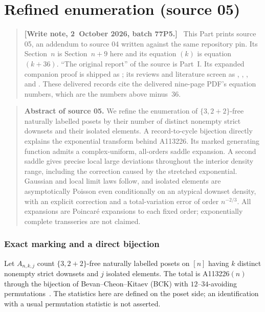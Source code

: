 \documentclass[11pt]{article}
\theoremstyle{remark}\newtheorem{remark}[theorem]{Remark}
\newenvironment{writenote}{\begin{quote}\small\raggedright\textbf{[Write note, 2~October 2026, batch 77P5.]}\ }{\end{quote}}
\begin{document}
\part{Refined enumeration (source 05)}
\label{vav:part:two}
\begin{writenote}
This Part prints source 05, an addendum to source 04 written against the
same repository pin. Its Section~$n$ is Section~$n+9$ here and its
equation $(k)$ is equation $(k+36)$. ``The original report'' of the source
is Part~I. Its expanded companion proof is shipped as
; its reviews and literature screen as
,
,
,
 and
. These delivered records cite the
delivered nine-page PDF's equation numbers, which are the numbers above
minus~36.
\end{writenote}
\begin{quote}\small
\textbf{Abstract of source 05.}
We refine the enumeration of $\{3,2+2\}$-free naturally labelled posets by their number of distinct nonempty strict downsets and their isolated elements. A record-to-cycle bijection directly explains the exponential transform behind A113226. Its marked generating function admits a complex-uniform, all-orders saddle expansion. A second saddle gives precise local large deviations throughout the interior density range, including the correction caused by the stretched exponential. Gaussian and local limit laws follow, and isolated elements are asymptotically Poisson even conditionally on an atypical downset density, with an explicit correction and a total-variation error of order $n^{-2/3}$. All expansions are Poincar\'e expansions to each fixed order; exponentially complete transseries are not claimed.
\end{quote}

\section{Exact marking and a direct bijection}\label{vav:rf:sec:marking}
Let $A_{n,k,j}$ count $\{3,2+2\}$-free naturally labelled posets on $[n]$ having $k$ distinct nonempty strict downsets and $j$ isolated elements. The total is A113226$(n)$ through the bijection of Bevan--Cheon--Kitaev (BCK) with $12$--$34$-avoiding permutations~\cite{bck}. The statistics here are defined on the poset side; an identification with a usual permutation statistic is not asserted.
\end{document}
